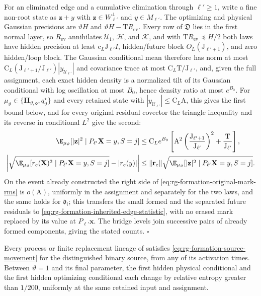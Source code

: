 For an eliminated edge and a cumulative elimination through \(\ell'\ge1\),
write a fine non-root state as \(\mathbf z+y\) with
\(\mathbf z\in W_{\ell'}^\perp\) and \(y\in M_{\ell'}\). The optimizing and
physical Gaussian precisions are \(\vartheta H\) and
\(\vartheta H-\mathrm TR_{\mathrm{ev}}\). Every row of \(\mathfrak D\) lies in the
first normal layer, so \(R_{\mathrm{ev}}\) annihilates \(\mathcal U_1\),
\(\mathcal H\), and \(\mathcal K\), and with \(\mathrm TR_{\mathrm{ev}}\preceq H/2\)
both laws have hidden precision at least \(\mathrm c_L\mathrm J_{\ell'}I\),
hidden/future block \(O_L(\mathrm J_{\ell'+1})\), and zero hidden/loop block.
The Gaussian conditional mean therefore has norm at most
\(\mathrm C_L(\mathrm J_{\ell'+1}/\mathrm J_{\ell'})|y_{\mathcal U_{\ell'}}|\) and
covariance trace at most \(\mathrm C_L\mathrm T/\mathrm J_{\ell'}\), and, given
the full assignment, each exact hidden density is a normalized tilt of its
Gaussian conditional with log oscillation at most \(B_0\), hence density ratio
at most \(e^{B_0}\). For
\(\mu_\vartheta\in\{\boldsymbol\Pi_{\vartheta,\mathsf o},q^\star_\vartheta\}\) and
every retained state with \(|y_{\mathcal U_{\ell'}}|\le\mathrm C_L\mathrm A\), this
gives the first bound below, and for every original residual covector the
triangle inequality and its reverse in conditional \(L^2\) give the second:
\begin{align}
 \E_{\mu_\vartheta}
   [|\mathbf z|^2\mid P_{\ell'}\mathbf X=y,S=j]
 &\le \mathrm C_Le^{B_0}\left[
       \mathrm A^2\left(\frac{\mathrm J_{\ell'+1}}{\mathrm J_{\ell'}}\right)^2
       +\frac{\mathrm T}{\mathrm J_{\ell'}}\right],
 \label{eq:rg-formation-hidden-original-mark-moment}\\
 \left|
 \sqrt{\E_{\mu_\vartheta}[r_e(\mathbf X)^2\mid P_{\ell'}\mathbf X=y,S=j]}
 -|r_e(y)|\right|
 &\le\|\mathbf r_e\|
      \sqrt{\E_{\mu_\vartheta}[|\mathbf z|^2\mid P_{\ell'}\mathbf X=y,S=j]}.
 \label{eq:rg-formation-original-mark-rms}
\end{align}
On the event already constructed the right side of
\cref{eq:rg-formation-original-mark-rms} is \(o(\mathrm A)\), uniformly in the
assignment and separately for the two laws, and the same holds for
\(\mathfrak d_i\); this transfers the small formed and the separated future
residuals to \cref{eq:rg-formation-inherited-edge-statistic}, with no erased
mark replaced by its value at \(P_{\ell'}\mathbf x\). The bridge levels join
successive pairs of already formed components, giving the stated counts.
\hfill\(\square\)

Every process or finite replacement lineage of
 satisfies
\cref{eq:rg-formation-source-movement} for the distinguished binary source,
from any of its activation times. Between \(\vartheta=1\) and its final
parameter, the first hidden physical conditional and the first hidden
optimizing conditional each change by relative entropy greater than
\(1/200\), uniformly at the same retained input and assignment.

